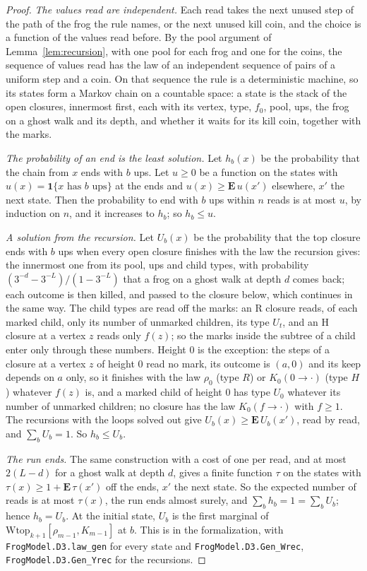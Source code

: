 \documentclass[11pt]{amsart}
\theoremstyle{definition}
\numberwithin{equation}{section}
\newcommand{\E}{\mathbf{E}}
\newcommand{\one}{\mathbf{1}}
\begin{document}
\begin{proof}
\emph{The values read are independent.} Each read takes the next unused step of the path of the frog the rule names, or the next unused kill coin, and the choice is a function of the values read before. By the pool argument of Lemma~\ref{lem:recursion}, with one pool for each frog and one for the coins, the sequence of values read has the law of an independent sequence of pairs of a uniform step and a coin. On that sequence the rule is a deterministic machine, so its states form a Markov chain on a countable space: a state is the stack of the open closures, innermost first, each with its vertex, type, $f_0$, pool, ups, the frog on a ghost walk and its depth, and whether it waits for its kill coin, together with the marks.

\emph{The probability of an end is the least solution.} Let $h_b(x)$ be the probability that the chain from $x$ ends with $b$ ups. Let $u\ge0$ be a function on the states with $u(x)=\one\{x\text{ has }b\text{ ups}\}$ at the ends and $u(x)\ge\E\,u(x')$ elsewhere, $x'$ the next state. Then the probability to end with $b$ ups within $n$ reads is at most $u$, by induction on $n$, and it increases to $h_b$; so $h_b\le u$.

\emph{A solution from the recursion.} Let $U_b(x)$ be the probability that the top closure ends with $b$ ups when every open closure finishes with the law the recursion gives: the innermost one from its pool, ups and child types, with probability $(3^{-d}-3^{-L})/(1-3^{-L})$ that a frog on a ghost walk at depth $d$ comes back; each outcome is then killed, and passed to the closure below, which continues in the same way. The child types are read off the marks: an R closure reads, of each marked child, only its number of unmarked children, its type $U_t$, and an H closure at a vertex $z$ reads only $f(z)$; so the marks inside the subtree of a child enter only through these numbers. Height $0$ is the exception: the steps of a closure at a vertex $z$ of height $0$ read no mark, its outcome is $(a,0)$ and its keep depends on $a$ only, so it finishes with the law $\rho_0$ (type $R$) or $K_0(0\to\cdot)$ (type $H$) whatever $f(z)$ is, and a marked child of height $0$ has type $U_0$ whatever its number of unmarked children; no closure has the law $K_0(f\to\cdot)$ with $f\ge1$. The recursions with the loops solved out give $U_b(x)\ge\E\,U_b(x')$, read by read, and $\sum_bU_b=1$. So $h_b\le U_b$.

\emph{The run ends.} The same construction with a cost of one per read, and at most $2(L-d)$ for a ghost walk at depth $d$, gives a finite function $\tau$ on the states with $\tau(x)\ge1+\E\,\tau(x')$ off the ends, $x'$ the next state. So the expected number of reads is at most $\tau(x)$, the run ends almost surely, and $\sum_bh_b=1=\sum_bU_b$; hence $h_b=U_b$. At the initial state, $U_b$ is the first marginal of $\mathrm{Wtop}_{k+1}[\rho_{m-1},K_{m-1}]$ at $b$. This is  in the formalization, with \texttt{FrogModel.D3.law\_gen} for every state and \texttt{FrogModel.D3.Gen\_Wrec}, \texttt{FrogModel.D3.Gen\_Yrec} for the recursions.
\end{proof}
\end{document}
